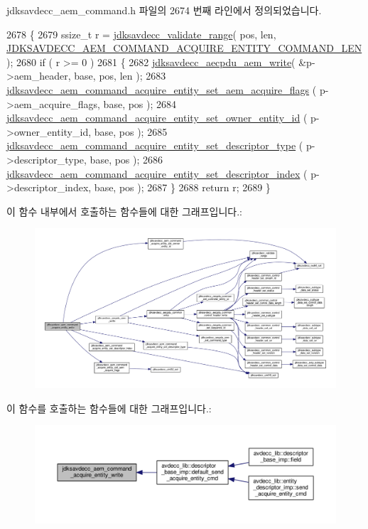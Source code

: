 jdksavdecc\+\_\+aem\+\_\+command.\+h 파일의 2674 번째 라인에서 정의되었습니다.


\begin{DoxyCode}
2678 \{
2679     ssize\_t r = \hyperlink{group__util_ga9c02bdfe76c69163647c3196db7a73a1}{jdksavdecc\_validate\_range}( pos, len, 
      \hyperlink{group__command__acquire__entity_gacd48c850101d4deef27e5c003f1c54cb}{JDKSAVDECC\_AEM\_COMMAND\_ACQUIRE\_ENTITY\_COMMAND\_LEN} );
2680     \textcolor{keywordflow}{if} ( r >= 0 )
2681     \{
2682         \hyperlink{group__aecpdu__aem_gad658e55771cce77cecf7aae91e1dcbc5}{jdksavdecc\_aecpdu\_aem\_write}( &p->aem\_header, base, pos, len );
2683         \hyperlink{group__command__acquire__entity_gaa7a3f18e047eb974ac0c00c6daf19b2a}{jdksavdecc\_aem\_command\_acquire\_entity\_set\_aem\_acquire\_flags}
      ( p->aem\_acquire\_flags, base, pos );
2684         \hyperlink{group__command__acquire__entity_ga7bd9d27911ecb80585dcc4062f2c5831}{jdksavdecc\_aem\_command\_acquire\_entity\_set\_owner\_entity\_id}
      ( p->owner\_entity\_id, base, pos );
2685         \hyperlink{group__command__acquire__entity_gafe85427400214c628dde618552b0a47f}{jdksavdecc\_aem\_command\_acquire\_entity\_set\_descriptor\_type}
      ( p->descriptor\_type, base, pos );
2686         \hyperlink{group__command__acquire__entity_ga3621b340b21c54b21bc010223787f31d}{jdksavdecc\_aem\_command\_acquire\_entity\_set\_descriptor\_index}
      ( p->descriptor\_index, base, pos );
2687     \}
2688     \textcolor{keywordflow}{return} r;
2689 \}
\end{DoxyCode}


이 함수 내부에서 호출하는 함수들에 대한 그래프입니다.\+:
\nopagebreak
\begin{figure}[H]
\begin{center}
\leavevmode
\includegraphics[width=350pt]{group__command__acquire__entity_ga8f6285801e4769fe5ed789c57306f264_cgraph}
\end{center}
\end{figure}




이 함수를 호출하는 함수들에 대한 그래프입니다.\+:
\nopagebreak
\begin{figure}[H]
\begin{center}
\leavevmode
\includegraphics[width=350pt]{group__command__acquire__entity_ga8f6285801e4769fe5ed789c57306f264_icgraph}
\end{center}
\end{figure}


